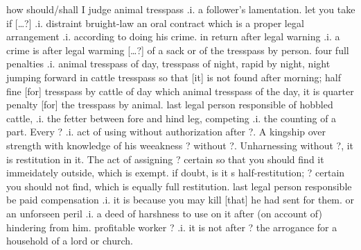 \documentclass[11pt]{article}
\begin{document}
\begin{pages}
 \begin{Rightside}
    \beginnumbering
    \pstart  
    how should/shall I judge animal tresspass .i. a follower's lamentation.  let you take if [\ldots?] .i. distraint bruight-law an oral contract which is a proper legal arrangement .i. according to doing his crime.  in return after legal warning .i. a crime is after legal warming [\ldots?] of a sack or of the tresspass by person.  four full penalties .i. animal tresspass of day, tresspass of night, rapid by night, night jumping forward in cattle tresspass so that [it] is not found after morning;  half fine [for] tresspass by cattle of day which animal tresspass of the day, it is quarter penalty [for] the tresspass by animal.  last legal person responsible of hobbled cattle, .i. the fetter between fore and hind leg, competing .i. the counting of a part. Every ? .i. act of using without authorization after ?. A kingship over strength with knowledge of his weeakness ? without ?.  Unharnessing without ?, it is restitution in it.  The act of assigning ? certain so that you should find it immeidately outside, which is exempt.  if doubt, is it s half-restitution; ? certain you should not find, which is equally full restitution.  last legal person responsible be paid compensation .i. it is because you may kill [that] he had sent for them.  or an unforseen peril .i. a deed of harshness to use on it after (on account of) hindering from him. profitable worker ? .i. it is not after ? the arrogance for a household of a lord or church.
    \pend

   \endnumbering
  \end{Rightside}
  \Pages


\end{pages}
\end{document}
